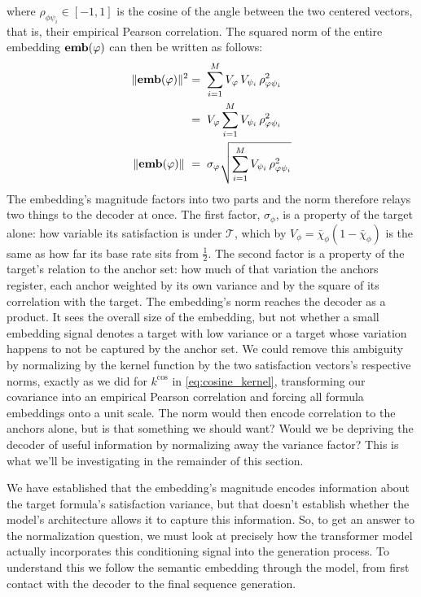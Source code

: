 \documentclass[titlepage,a4paper,11pt]{report}
\begin{document}
    where $\rho_{\phi\psi_i} \in [-1,1]$ is the cosine of the angle between the two centered vectors, that is, their empirical Pearson correlation. The squared norm of the entire embedding $\textbf{emb}(\varphi)$ can then be written as follows:
    \begin{equation}\label{eq:emb_norm}
    \begin{split}
    \Vert \textbf{emb}(\varphi) \Vert^2    & =\; \sum_{i=1}^{M} V_\varphi \, V_{\psi_i} \, \rho^2_{\varphi\psi_i} \\
                                & =\; V_\varphi \sum_{i=1}^{M} V_{\psi_i}\, \rho^2_{\varphi\psi_i} \\
    \Vert \textbf{emb}(\varphi) \Vert \    & =\; \sigma_\varphi \sqrt{\sum_{i=1}^{M} V_{\psi_i}\, \rho^2_{\varphi\psi_i}} \\
    \end{split}
    \end{equation}
    The embedding's magnitude factors into two parts and the norm therefore relays two things to the decoder at once. The first factor, $\sigma_\phi$, is a property of the target alone: how variable its satisfaction is under $\mathcal{T}$, which by $V_\phi = \bar\chi_\phi(1-\bar\chi_\phi)$ is the same as how far its base rate sits from $\tfrac{1}{2}$. The second factor is a property of the target's relation to the anchor set: how much of that variation the anchors register, each anchor weighted by its own variance and by the square of its correlation with the target. The embedding's norm reaches the decoder as a product. It sees the overall size of the embedding, but not whether a small embedding signal denotes a target with low variance or a target whose variation happens to not be captured by the anchor set. We could remove this ambiguity by normalizing by the kernel function by the two satisfaction vectors's respective norms, exactly as we did for $k^{\cos}$ in \ref{eq:cosine_kernel}, transforming our covariance into an empirical Pearson correlation and forcing all formula embeddings onto a unit scale. The norm would then encode correlation to the anchors alone, but is that something we should want? Would we be depriving the decoder of useful information by normalizing away the variance factor? This is what we'll be investigating in the remainder of this section.  

    We have established that the embedding's magnitude encodes information about the target formula's satisfaction variance, but that doesn't establish whether the model's architecture allows it to capture this information. So, to get an answer to the normalization question, we must look at precisely how the transformer model actually incorporates this conditioning signal into the generation process. To understand this we follow the semantic embedding through the model, from first contact with the decoder to the final sequence generation. 
        
\end{document}
